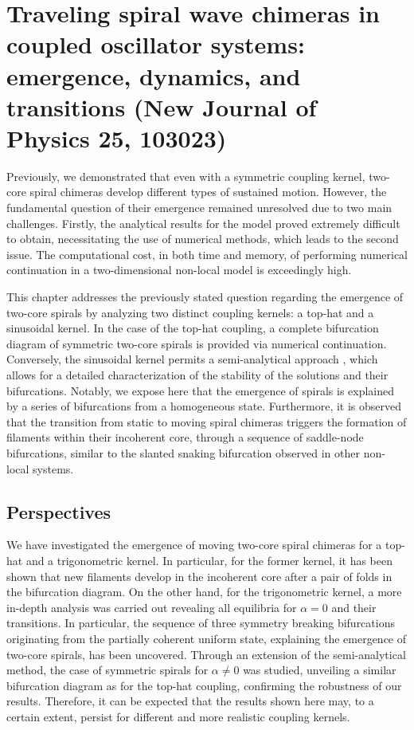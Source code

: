 \chapter{Traveling spiral wave chimeras in coupled
oscillator systems: emergence, dynamics, and
transitions (New Journal of Physics 25, 103023)}

Previously, we demonstrated that even with a symmetric coupling kernel, two-core spiral chimeras develop different
types of sustained motion. However, the fundamental question of their emergence remained
unresolved due to two main challenges. Firstly, the analytical results for the model proved
extremely difficult to obtain, necessitating the use of numerical methods, which leads to the second 
issue. The computational cost, in both time
and memory, of performing numerical continuation in a two-dimensional non-local model is exceedingly high.

This chapter addresses the previously stated question regarding the emergence of two-core spirals by analyzing two distinct coupling kernels: a
top-hat and a sinusoidal kernel. In the case of the top-hat coupling, a complete bifurcation diagram of symmetric two-core spirals
is provided via numerical continuation. Conversely, the sinusoidal kernel
permits a semi-analytical approach \cite{omel2018stability,xie2015twisted,omel2019chimerapedia}, which allows for a detailed 
characterization of the stability of the solutions and their bifurcations. Notably,
we expose here that the emergence of spirals is explained by a series of bifurcations from a homogeneous
state. Furthermore, it is observed that the transition from static to moving spiral chimeras
triggers the formation of filaments within their incoherent core, through a sequence of saddle-node
bifurcations, similar to the slanted snaking bifurcation observed in other non-local systems. 



\section{Perspectives}

We have investigated the emergence of moving two-core spiral chimeras for a top-hat
and a trigonometric kernel. In particular, for the former kernel, it has been shown
that new filaments develop in the incoherent core after a pair of folds in the bifurcation diagram.
On the other hand, for the trigonometric kernel, a more in-depth analysis was carried out
revealing all equilibria for $\alpha=0$ and their transitions. In particular, the sequence
of three symmetry breaking bifurcations originating from the partially coherent uniform state, 
explaining the emergence of two-core spirals, has been uncovered. Through an extension of the
semi-analytical method, the case of symmetric spirals for $\alpha \neq 0$ was studied, unveiling a similar
bifurcation diagram as for the top-hat coupling, confirming the robustness of our results.
Therefore, it can be expected that the results shown here may, to a certain extent, persist
for different and more realistic coupling kernels. 

